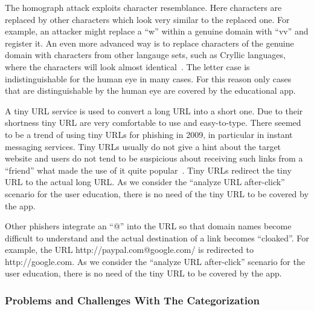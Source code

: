 \begin{description}[leftmargin=0cm]
	\item[Homograph Attack] The homograph attack exploits character resemblance. Here characters are replaced by other characters which look very similar to the replaced one. For example, an attacker might replace a ``w'' within a genuine domain with ``vv'' and register it. An even more advanced way is to replace characters of the genuine domain with characters from other langauge sets, such as Cryllic languages, where the characters will look almost identical~\cite{gabrilovich2002homograph}. The letter case is indistinguishable for the human eye in many cases. For this reason only cases that are distinguishable by the human eye are covered by the educational app.
	\item[Tiny URLs] A tiny URL service is used to convert a long URL into a short one. Due to their shortness tiny URL are very comfortable to use and easy-to-type. There seemed to be a trend of using tiny URLs for phishing in 2009, in particular in instant messaging services. Tiny URLs usually do not give a hint about the target website and users do not tend to be suspicious about receiving such links from a ``friend'' what made the use of it quite popular~\cite{tinyurlpcworld}. Tiny URLs redirect the tiny URL to the actual long URL. As we consider the ``analyze URL after-click'' scenario for the user education, there is no need of the tiny URL to be covered by the app.
		\item[Cloaked URLs] Other phishers integrate an ``@'' into the URL so that domain names become difficult to understand and the actual destination of a link becomes ``cloaked''\cite{alnajim2009fighting}. For example, the URL http://paypal.com@google.com/ is redirected to http://google.com. As we consider the ``analyze URL after-click'' scenario for the user education, there is no need of the tiny URL to be covered by the app.
\end{description}

\subsubsection{Problems and Challenges With The Categorization}

